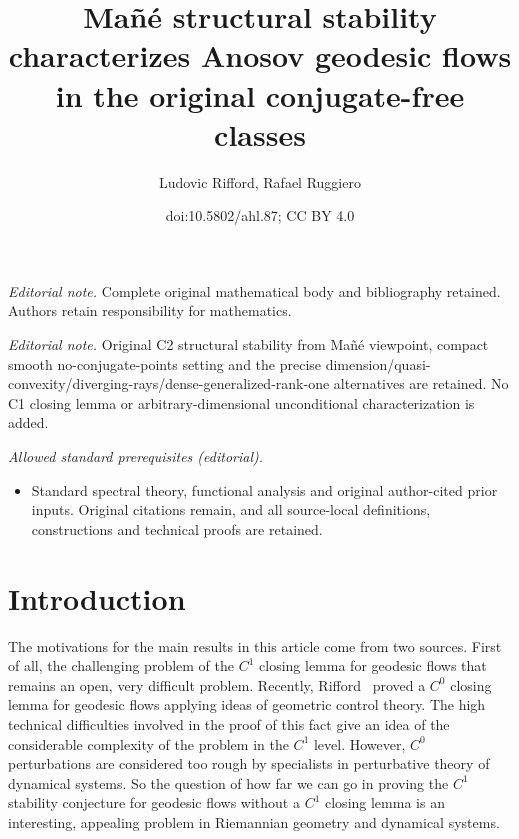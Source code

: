 \documentclass[10pt]{amsart}
\title{Mañé structural stability characterizes Anosov geodesic flows in the original conjugate-free classes}
\author{Ludovic Rifford, Rafael Ruggiero}
\date{doi:10.5802/ahl.87; CC BY 4.0}
\theoremstyle{definition}
\begin{document}
\maketitle
\noindent\textit{Editorial note.} Complete original mathematical body and bibliography retained. Authors retain responsibility for mathematics.\par\medskip
\noindent\textit{Editorial note.} Original C2 structural stability from Mañé viewpoint, compact smooth no-conjugate-points setting and the precise dimension/quasi-convexity/diverging-rays/dense-generalized-rank-one alternatives are retained. No C1 closing lemma or arbitrary-dimensional unconditional characterization is added.\par\medskip
\noindent\textit{Allowed standard prerequisites (editorial).}\begin{itemize}
\item Standard spectral theory, functional analysis and original author-cited prior inputs. Original citations remain, and all source-local definitions, constructions and technical proofs are retained.
\end{itemize}\medskip
\section{Introduction}

The motivations for the main results in this article come from two sources. First of all, the challenging problem of the $C^{1}$ closing lemma for geodesic flows that remains an open, very difficult problem. Recently, Rifford~\cite{kn:Rifford} proved a $C^{0}$ closing lemma for geodesic flows applying ideas of geometric control theory. The high technical difficulties involved in the proof of this fact give an idea of the considerable complexity of the problem in the $C^{1}$ level. However, $C^{0}$ perturbations are considered too rough by specialists in perturbative theory of dynamical systems. So the question of how far we can go in proving the $C^{1}$ stability conjecture for geodesic flows without a $C^{1}$ closing lemma is an interesting, appealing problem in Riemannian geometry and dynamical systems.
\end{document}
